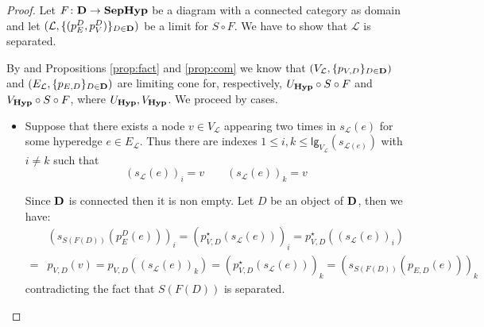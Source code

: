 \documentclass[3p]{elsarticle}
\newcommand{\lgh}{\mathsf{lg}}
\def\D{\textbf {\textup{D}}}
\newcommand{\catname}[1]{\textbf{\textup{#1}}}
\newcommand{\hyp}{\catname{Hyp}}
\newcommand{\shyp}{\catname{SepHyp}}
\theoremstyle{remark}
\theoremstyle{definition}
\begin{document}
\seppb*
\begin{proof}\label{proof:seplim}
	Let $F\colon \D\to \shyp $ be a diagram with a connected category as domain and let $(\mathcal{L}, \{(p_E^D, p^D_V)\}_{D\in \D})$ be a limit for $S\circ F$. We have to show that $\mathcal{L}$ is separated.
	
	By  and Propositions \ref{prop:fact} and \ref{prop:com} we know that  $(V_\mathcal{L}, \{p_{V, D}\}_{D\in \D})$  and $(E_\mathcal{L}, \{p_{E, D}\}_{D\in \D})$ are limiting cone for, respectively,  $U_{\hyp}\circ S\circ F$ and $V_{\hyp}\circ S\circ F$, where $U_{\hyp}, V_{\hyp}$. We proceed by cases.
	\begin{itemize}
		\item Suppose that there exists a node $v\in V_{\mathcal{L}}$ appearing two times in  $s_{\mathcal{L}}(e)$ for some hyperedge $e\in E_{\mathcal{L}}$. Thus there are indexes $1\leq i, k \leq \lgh_{V_{\mathcal{L}}}(s_{\mathcal{L}(e)})$ with $i\neq k$  such that
		\[(s_{\mathcal{L}}(e))_i=v \qquad  (s_{\mathcal{L}}(e) )_k= v\]
		
		Since $\D$ is connected then it is non empty. Let  $D$ be an object of $\D$, then we have:
		\begin{align*}
		&(s_{S(F(D))}( p^D_{E}(e)))_i = ( p^\star_{V,D}(s_{\mathcal{L}}(e)))_i=p^\star_{V, D}((s_{\mathcal{L}}(e))_i)\\=&p_{V,D}(v)=p_{V, D}((s_{\mathcal{L}}(e))_k)=(p^\star_{V,D}(s_{\mathcal{L}}(e)))_k=(s_{S(F(D))}( p_{E,D}(e)))_k  	
		\end{align*}
		contradicting the fact that $S(F(D))$ is separated.
		

\end{itemize}
\end{proof}
\end{document}
